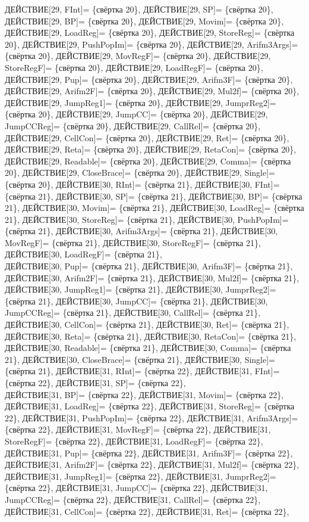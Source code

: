 \documentclass[a0]{a0poster}
\begin{document}
ДЕЙСТВИЕ[29, FInt]= \{свёртка 20\}, ДЕЙСТВИЕ[29, SP]= \{свёртка 20\}, ДЕЙСТВИЕ[29, BP]= \{свёртка 20\}, ДЕЙСТВИЕ[29, Movim]= \{свёртка 20\}, ДЕЙСТВИЕ[29, LoadReg]= \{свёртка 20\}, ДЕЙСТВИЕ[29, StoreReg]= \{свёртка 20\}, ДЕЙСТВИЕ[29, PushPopIm]= \{свёртка 20\}, ДЕЙСТВИЕ[29, Arifm3Args]= \{свёртка 20\}, ДЕЙСТВИЕ[29, MovRegF]= \{свёртка 20\}, ДЕЙСТВИЕ[29, StoreRegF]= \{свёртка 20\}, ДЕЙСТВИЕ[29, LoadRegF]= \{свёртка 20\}, ДЕЙСТВИЕ[29, Pup]= \{свёртка 20\}, ДЕЙСТВИЕ[29, Arifm3F]= \{свёртка 20\}, ДЕЙСТВИЕ[29, Arifm2F]= \{свёртка 20\}, ДЕЙСТВИЕ[29, Mul2f]= \{свёртка 20\}, ДЕЙСТВИЕ[29, JumpReg1]= \{свёртка 20\}, ДЕЙСТВИЕ[29, JumprReg2]= \{свёртка 20\}, ДЕЙСТВИЕ[29, JumpCC]= \{свёртка 20\}, ДЕЙСТВИЕ[29, JumpCCReg]= \{свёртка 20\}, ДЕЙСТВИЕ[29, CallRel]= \{свёртка 20\}, \\
ДЕЙСТВИЕ[29, CellCon]= \{свёртка 20\}, ДЕЙСТВИЕ[29, Ret]= \{свёртка 20\}, ДЕЙСТВИЕ[29, Reta]= \{свёртка 20\}, ДЕЙСТВИЕ[29, RetaCon]= \{свёртка 20\}, ДЕЙСТВИЕ[29, Readable]= \{свёртка 20\}, ДЕЙСТВИЕ[29, Comma]= \{свёртка 20\}, ДЕЙСТВИЕ[29, CloseBrace]= \{свёртка 20\}, ДЕЙСТВИЕ[29, Single]= \{свёртка 20\}, ДЕЙСТВИЕ[30, RInt]= \{свёртка 21\}, ДЕЙСТВИЕ[30, FInt]= \{свёртка 21\}, ДЕЙСТВИЕ[30, SP]= \{свёртка 21\}, ДЕЙСТВИЕ[30, BP]= \{свёртка 21\}, ДЕЙСТВИЕ[30, Movim]= \{свёртка 21\}, ДЕЙСТВИЕ[30, LoadReg]= \{свёртка 21\}, ДЕЙСТВИЕ[30, StoreReg]= \{свёртка 21\}, ДЕЙСТВИЕ[30, PushPopIm]= \{свёртка 21\}, ДЕЙСТВИЕ[30, Arifm3Args]= \{свёртка 21\}, ДЕЙСТВИЕ[30, MovRegF]= \{свёртка 21\}, ДЕЙСТВИЕ[30, StoreRegF]= \{свёртка 21\}, ДЕЙСТВИЕ[30, LoadRegF]= \{свёртка 21\}, \\
ДЕЙСТВИЕ[30, Pup]= \{свёртка 21\}, ДЕЙСТВИЕ[30, Arifm3F]= \{свёртка 21\}, ДЕЙСТВИЕ[30, Arifm2F]= \{свёртка 21\}, ДЕЙСТВИЕ[30, Mul2f]= \{свёртка 21\}, ДЕЙСТВИЕ[30, JumpReg1]= \{свёртка 21\}, ДЕЙСТВИЕ[30, JumprReg2]= \{свёртка 21\}, ДЕЙСТВИЕ[30, JumpCC]= \{свёртка 21\}, ДЕЙСТВИЕ[30, JumpCCReg]= \{свёртка 21\}, ДЕЙСТВИЕ[30, CallRel]= \{свёртка 21\}, ДЕЙСТВИЕ[30, CellCon]= \{свёртка 21\}, ДЕЙСТВИЕ[30, Ret]= \{свёртка 21\}, ДЕЙСТВИЕ[30, Reta]= \{свёртка 21\}, ДЕЙСТВИЕ[30, RetaCon]= \{свёртка 21\}, ДЕЙСТВИЕ[30, Readable]= \{свёртка 21\}, ДЕЙСТВИЕ[30, Comma]= \{свёртка 21\}, ДЕЙСТВИЕ[30, CloseBrace]= \{свёртка 21\}, ДЕЙСТВИЕ[30, Single]= \{свёртка 21\}, ДЕЙСТВИЕ[31, RInt]= \{свёртка 22\}, ДЕЙСТВИЕ[31, FInt]= \{свёртка 22\}, ДЕЙСТВИЕ[31, SP]= \{свёртка 22\}, \\
ДЕЙСТВИЕ[31, BP]= \{свёртка 22\}, ДЕЙСТВИЕ[31, Movim]= \{свёртка 22\}, ДЕЙСТВИЕ[31, LoadReg]= \{свёртка 22\}, ДЕЙСТВИЕ[31, StoreReg]= \{свёртка 22\}, ДЕЙСТВИЕ[31, PushPopIm]= \{свёртка 22\}, ДЕЙСТВИЕ[31, Arifm3Args]= \{свёртка 22\}, ДЕЙСТВИЕ[31, MovRegF]= \{свёртка 22\}, ДЕЙСТВИЕ[31, StoreRegF]= \{свёртка 22\}, ДЕЙСТВИЕ[31, LoadRegF]= \{свёртка 22\}, ДЕЙСТВИЕ[31, Pup]= \{свёртка 22\}, ДЕЙСТВИЕ[31, Arifm3F]= \{свёртка 22\}, ДЕЙСТВИЕ[31, Arifm2F]= \{свёртка 22\}, ДЕЙСТВИЕ[31, Mul2f]= \{свёртка 22\}, ДЕЙСТВИЕ[31, JumpReg1]= \{свёртка 22\}, ДЕЙСТВИЕ[31, JumprReg2]= \{свёртка 22\}, ДЕЙСТВИЕ[31, JumpCC]= \{свёртка 22\}, ДЕЙСТВИЕ[31, JumpCCReg]= \{свёртка 22\}, ДЕЙСТВИЕ[31, CallRel]= \{свёртка 22\}, ДЕЙСТВИЕ[31, CellCon]= \{свёртка 22\}, ДЕЙСТВИЕ[31, Ret]= \{свёртка 22\}, \\
\end{document}
